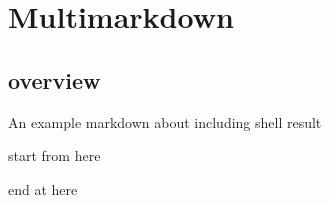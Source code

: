 \part{Multimarkdown}
\label{multimarkdown}

\chapter{overview}
\label{overview}

An example markdown about including shell result

start from here

  

end at here
